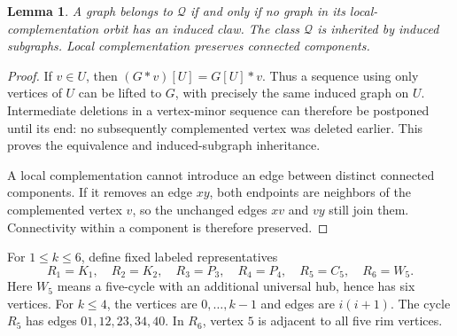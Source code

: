 \documentclass[11pt,letterpaper]{article}
\newtheorem{lemma}[theorem]{Lemma}
\begin{document}
\begin{lemma}\label{lem:closure}
A graph belongs to $\mathcal Q$ if and only if no graph in its local-complementation orbit has an induced claw. The class $\mathcal Q$ is inherited by induced subgraphs. Local complementation preserves connected components.
\end{lemma}
\begin{proof}
If $v\in U$, then $(G*v)[U]=G[U]*v$. Thus a sequence using only vertices of $U$ can be lifted to $G$, with precisely the same induced graph on $U$. Intermediate deletions in a vertex-minor sequence can therefore be postponed until its end: no subsequently complemented vertex was deleted earlier. This proves the equivalence and induced-subgraph inheritance.

A local complementation cannot introduce an edge between distinct connected components. If it removes an edge $xy$, both endpoints are neighbors of the complemented vertex $v$, so the unchanged edges $xv$ and $vy$ still join them. Connectivity within a component is therefore preserved.
\end{proof}

For $1\leq k\leq6$, define fixed labeled representatives
\begin{equation}\label{eq:reps}
 R_1=K_1,\quad R_2=K_2,\quad R_3=P_3,\quad R_4=P_4,\quad R_5=C_5,\quad R_6=W_5.
\end{equation}
Here $W_5$ means a five-cycle with an additional universal hub, hence has six vertices. For $k\leq4$, the vertices are $0,\ldots,k-1$ and edges are $i(i+1)$. The cycle $R_5$ has edges $01,12,23,34,40$. In $R_6$, vertex $5$ is adjacent to all five rim vertices.
\end{document}
